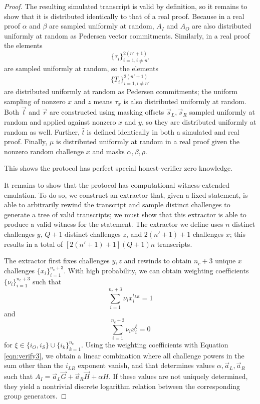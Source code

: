 \documentclass{article}
\begin{document}
\begin{proof}
	The resulting simulated transcript is valid by definition, so it remains to show that it is distributed identically to that of a real proof.
	Because in a real proof $\alpha$ and $\beta$ are sampled uniformly at random, $A_I$ and $A_O$ are also distributed uniformly at random as Pedersen vector commitments.
	Similarly, in a real proof the elements
	$$\{ \tau_i \}_{i=1, i \neq n'}^{2(n' + 1)}$$
	are sampled uniformly at random, so the elements
	$$\{ T_i \}_{i=1, i \neq n'}^{2(n' + 1)}$$
	are distributed uniformly at random as Pedersen commitments; the uniform sampling of nonzero $x$ and $z$ means $\tau_x$ is also distributed uniformly at random.
	Both $\vec{l}$ and $\vec{r}$ are constructed using masking offsets $\vec{s}_L, \vec{s}_R$ sampled uniformly at random and applied against nonzero $x$ and $y$, so they are distributed uniformly at random as well.
	Further, $\widehat{t}$ is defined identically in both a simulated and real proof.
	Finally, $\mu$ is distributed uniformly at random in a real proof given the nonzero random challenge $x$ and masks $\alpha, \beta, \rho$.

	This shows the protocol has perfect special honest-verifier zero knowledge.

	It remains to show that the protocol has computational witness-extended emulation.
	To do so, we construct an extractor that, given a fixed statement, is able to arbitrarily rewind the transcript and sample distinct challenges to generate a tree of valid transcripts; we must show that this extractor is able to produce a valid witness for the statement.
	The extractor we define uses $n$ distinct challenges $y$, $Q + 1$ distinct challenges $z$, and $2(n' + 1) + 1$ challenges $x$; this results in a total of $\left[ 2(n' + 1) + 1 \right] (Q + 1) n$ transcripts.

	The extractor first fixes challenges $y, z$ and rewinds to obtain $n_c + 3$ unique $x$ challenges $\{ x_i \}_{i=1}^{n_c + 3}$.
	With high probability, we can obtain weighting coefficients $\{ \nu_i \}_{i=1}^{n_c + 3}$ such that
	$$\sum_{i=1}^{n_c + 3} \nu_i x_i^{i_{LR}} = 1$$
	and
	$$\sum_{i=1}^{n_c + 3} \nu_i x_i^\xi = 0$$
	for $\xi \in \{ i_O, i_S \} \cup \{ i_k \}_{k=1}^{n_c}$.
	Using the weighting coefficients with Equation \ref{eqn:verify3}, we obtain a linear combination where all challenge powers in the sum other than the $i_{LR}$ exponent vanish, and that determines values $\alpha, \vec{a}_L, \vec{a}_R$ such that $A_I = \vec{a}_L \vec{G} + \vec{a}_R \vec{H} + \alpha H$.
	If these values are not uniquely determined, they yield a nontrivial discrete logarithm relation between the corresponding group generators.


\end{proof}
\end{document}
